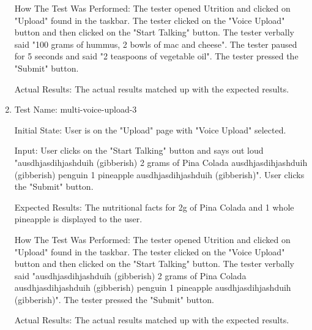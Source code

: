 \documentclass[12pt, titlepage]{article}
\begin{document}
\begin{enumerate}
		How The Test Was Performed: The tester opened Utrition and clicked on "Upload" found in the taskbar. The tester clicked on the "Voice Upload" button and then clicked on the "Start Talking" button. The tester verbally said "100 grams of hummus, 2 bowls of mac and cheese". The tester paused for 5 seconds and said "2 teaspoons of vegetable oil". The tester pressed the "Submit" button.
		
		Actual Results: The actual results matched up with the expected results.
		
		\item{Test Name: multi-voice-upload-3}
		
		Initial State: User is on the "Upload" page with "Voice Upload" selected.
		
		Input: User clicks on the "Start Talking" button and says out loud "ausdhjasdihjashduih (gibberish) 2 grams of Pina Colada ausdhjasdihjashduih (gibberish) penguin 1 pineapple ausdhjasdihjashduih (gibberish)". User clicks the "Submit" button.
		
		Expected Results: The nutritional facts for 2g of Pina Colada and 1 whole pineapple is displayed to the user.
		
		How The Test Was Performed: The tester opened Utrition and clicked on "Upload" found in the taskbar. The tester clicked on the "Voice Upload" button and then clicked on the "Start Talking" button. The tester verbally said "ausdhjasdihjashduih (gibberish) 2 grams of Pina Colada ausdhjasdihjashduih (gibberish) penguin 1 pineapple ausdhjasdihjashduih (gibberish)". The tester pressed the "Submit" button.
		
		Actual Results: The actual results matched up with the expected results.
		
	\end{enumerate}
\end{document}
